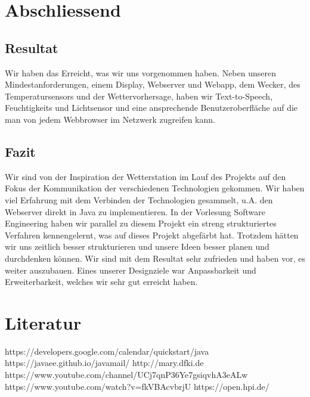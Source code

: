 \documentclass[11pt,a4paper]{article}
\begin{document}
\section{Abschliessend}
\subsection{Resultat}
Wir haben das Erreicht, was wir uns vorgenommen haben. Neben unseren Mindestanforderungen, einem Display, Webserver und Webapp, dem Wecker, des Temperatursensors und der Wettervorhersage, haben wir Text-to-Speech, Feuchtigkeits und Lichtsensor und eine ansprechende Benutzeroberfläche auf die man von jedem Webbrowser im Netzwerk zugreifen kann.

\subsection{Fazit}
Wir sind von der Inspiration der Wetterstation im Lauf des Projekts auf den Fokus der Kommunikation der verschiedenen Technologien gekommen. Wir haben viel Erfahrung mit dem Verbinden der Technologien gesammelt, u.A. den Webserver direkt in Java zu implementieren. In der Vorlesung Software Engineering haben wir parallel zu diesem Projekt ein streng strukturiertes Verfahren kennengelernt, was auf dieses Projekt abgefärbt hat. Trotzdem hätten wir uns zeitlich besser strukturieren und unsere Ideen besser planen und durchdenken können.
Wir sind mit dem Resultat sehr zufrieden und haben vor, es weiter auszubauen. Eines unserer Designziele war Anpassbarkeit und Erweiterbarkeit, welches wir sehr gut erreicht haben.

\section{Literatur}
https://developers.google.com/calendar/quickstart/java \newline
https://javaee.github.io/javamail/ \newline
http://mary.dfki.de \newline
https://www.youtube.com/channel/UCj7qnP36Ye7gsiqvhA3eALw \newline
https://www.youtube.com/watch?v=fkVBAcvbrjU \newline
https://open.hpi.de/ \newline
%
%
\end{document}
